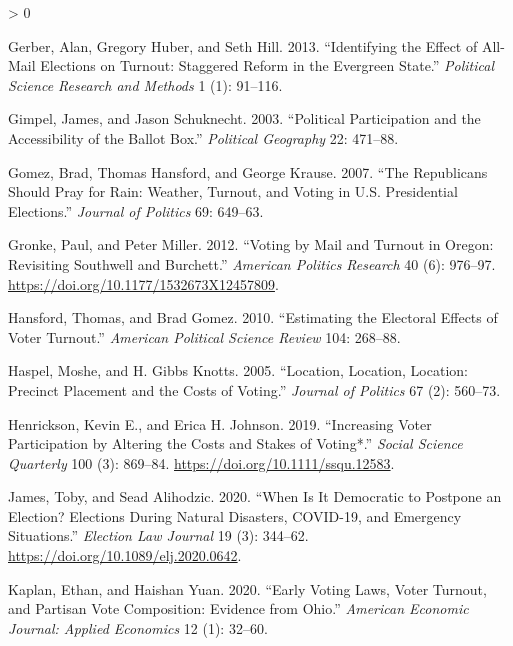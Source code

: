 \documentclass[
  12pt,
]{article}
\newlength{\cslhangindent}
\newenvironment{CSLReferences}[2] %
 {%
  \setlength{\parindent}{0pt}
  \ifodd #1 \everypar{\setlength{\hangindent}{\cslhangindent}}\ignorespaces\fi
  \ifnum #2 > 0
  \setlength{\parskip}{#2\baselineskip}
  \fi
 }%
 {}
\begin{document}
\begin{CSLReferences}{1}{0}
\leavevmode\hypertarget{ref-Gerber2013}{}%
Gerber, Alan, Gregory Huber, and Seth Hill. 2013. {``Identifying the {Effect} of {All}-{Mail Elections} on {Turnout}: {Staggered Reform} in the {Evergreen State}.''} \emph{Political Science Research and Methods} 1 (1): 91--116.

\leavevmode\hypertarget{ref-Gimpel2003}{}%
Gimpel, James, and Jason Schuknecht. 2003. {``Political {Participation} and the {Accessibility} of the {Ballot Box}.''} \emph{Political Geography} 22: 471--88.

\leavevmode\hypertarget{ref-Gomez2007}{}%
Gomez, Brad, Thomas Hansford, and George Krause. 2007. {``The {Republicans Should Pray} for {Rain}: {Weather}, {Turnout}, and {Voting} in {U}.{S}. {Presidential Elections}.''} \emph{Journal of Politics} 69: 649--63.

\leavevmode\hypertarget{ref-Gronke2012}{}%
Gronke, Paul, and Peter Miller. 2012. {``Voting by {Mail} and {Turnout} in {Oregon}: {Revisiting Southwell} and {Burchett}.''} \emph{American Politics Research} 40 (6): 976--97. \url{https://doi.org/10.1177/1532673X12457809}.

\leavevmode\hypertarget{ref-Hansford2010}{}%
Hansford, Thomas, and Brad Gomez. 2010. {``Estimating the {Electoral Effects} of {Voter Turnout}.''} \emph{American Political Science Review} 104: 268--88.

\leavevmode\hypertarget{ref-Haspel2005}{}%
Haspel, Moshe, and H. Gibbs Knotts. 2005. {``Location, {Location}, {Location}: {Precinct Placement} and the {Costs} of {Voting}.''} \emph{Journal of Politics} 67 (2): 560--73.

\leavevmode\hypertarget{ref-Henrickson2019}{}%
Henrickson, Kevin E., and Erica H. Johnson. 2019. {``Increasing {Voter Participation} by {Altering} the {Costs} and {Stakes} of {Voting}*.''} \emph{Social Science Quarterly} 100 (3): 869--84. \url{https://doi.org/10.1111/ssqu.12583}.

\leavevmode\hypertarget{ref-James2020}{}%
James, Toby, and Sead Alihodzic. 2020. {``When {Is It Democratic} to {Postpone} an {Election}? {Elections During Natural Disasters}, {COVID}-19, and {Emergency Situations}.''} \emph{Election Law Journal} 19 (3): 344--62. \url{https://doi.org/10.1089/elj.2020.0642}.

\leavevmode\hypertarget{ref-Kaplan2020}{}%
Kaplan, Ethan, and Haishan Yuan. 2020. {``Early {Voting Laws}, {Voter Turnout}, and {Partisan Vote Composition}: {Evidence} from {Ohio}.''} \emph{American Economic Journal: Applied Economics} 12 (1): 32--60.


\end{CSLReferences}
\end{document}
